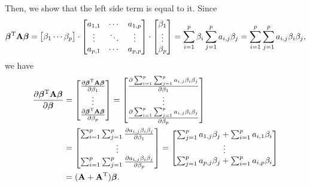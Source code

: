 \documentclass[a4paper]{article}
\begin{document}
Then, we show that the left side term is equal to it. Since 
\begin{align*}
\bm{\beta}^{\rm T} \bm{\mathrm{A}} \bm{\beta} =
\begin{bmatrix}
\beta_{1} \cdots \beta_{p}
\end{bmatrix}
\cdot
\begin{bmatrix}
a_{1,1} & \cdots & a_{1,p} \\
\vdots & \ddots & \vdots \\
a_{p,1} & \cdots & a_{p,p} \\
\end{bmatrix}
\cdot
\begin{bmatrix}
\beta_{1}\\
\vdots\\
\beta_{p}
\end{bmatrix}
= \sum_{i=1}^{p}\beta_{i} \sum_{j=1}^{p} a_{i,j}\beta_{j}
= \sum_{i=1}^{p} \sum_{j=1}^{p} a_{i,j} \beta_{i} \beta_{j},
\end{align*}
we have
\begin{align*}
\frac{\partial \bm{\beta}^{\rm T}\bm{\mathrm{A}}\bm{\beta}}{\partial \bm{\beta}}
&=
\begin{bmatrix}
\frac{\partial \bm{\beta}^{\rm T}\bm{\mathrm{A}}\bm{\beta}}{\partial \beta_{1}}\\
\vdots\\
\frac{\partial \bm{\beta}^{\rm T}\bm{\mathrm{A}}\bm{\beta}}{\partial \beta_{p}}\\
\end{bmatrix}
=
\begin{bmatrix}
\frac{\partial \sum_{i=1}^{p} \sum_{j=1}^{p} a_{i,j} \beta_{i} \beta_{j}}{\partial \beta_{1}}\\
\vdots\\
\frac{\partial \sum_{i=1}^{p} \sum_{j=1}^{p} a_{i,j} \beta_{i} \beta_{j}}{\partial \beta_{p}}\\
\end{bmatrix}
\\
&=
\begin{bmatrix}
\sum_{i=1}^{p} \sum_{j=1}^{p} \frac{ \partial a_{i,j} \beta_{i} \beta_{j}}{\partial \beta_{1}}\\
\vdots\\
\sum_{i=1}^{p} \sum_{j=1}^{p} \frac{\partial a_{i,j} \beta_{i} \beta_{j}}{\partial \beta_{p}}\\
\end{bmatrix}
=
\begin{bmatrix}
\sum_{j=1}^{p} a_{1,j} \beta_{j} + \sum_{i=1}^{p} a_{i,1} \beta_{i}\\
\vdots\\
\sum_{j=1}^{p} a_{p,j} \beta_{j} + \sum_{i=1}^{p} a_{i,p} \beta_{i}\\
\end{bmatrix}
\\
&= (\bm{\mathrm{A}} + \bm{\mathrm{A}}^{\rm T})\bm{\beta}.
\end{align*}
\end{document}
